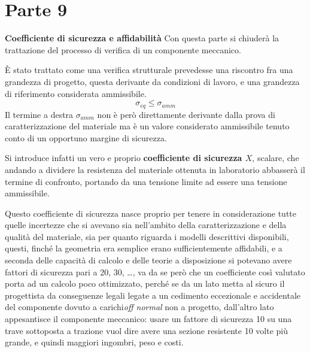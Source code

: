 \documentclass{article}
\def\outcome{\textbf{Learning Outcomes:} Outcomes go here. }
\begin{document}
	\section*{Parte 9} %

\begin{adjustwidth}{2in}{} 
	
\textbf{{\Large Coefficiente di
		sicurezza e affidabilità}} \mbox{} \newline
		Con questa parte si chiuderà la trattazione del processo di verifica di un componente meccanico. \newline
		
		È stato trattato come una verifica strutturale prevedesse una riscontro fra una grandezza di progetto, questa derivante da condizioni di lavoro, e una grandezza di riferimento considerata ammissibile. 		
		\[\sigma_{eq}\leq \sigma_{amm}\]		
		Il termine a destra $\sigma_{amm}$ non è però direttamente derivante dalla prova di caratterizzazione del materiale ma è un valore considerato ammissibile tenuto conto di un opportuno margine di sicurezza. \newline
		
		Si introduce infatti un vero e proprio \textbf{coefficiente di sicurezza $X$}, scalare, che andando a dividere la resistenza del materiale ottenuta in laboratorio abbasserà il termine di confronto, portando da una tensione limite ad essere una tensione ammissibile. \newline
		
		Questo coefficiente di sicurezza nasce proprio per tenere in considerazione tutte quelle incertezze che si avevano sia nell'ambito della caratterizzazione e della qualità del materiale, sia per quanto riguarda i modelli descrittivi disponibili, questi, finché la geometria era semplice erano sufficientemente affidabili, e a seconda delle capacità di calcolo e delle teorie a disposizione si potevano avere fattori di sicurezza pari a 20, 30, \dots, va da se però che un coefficiente così valutato porta ad un calcolo poco ottimizzato, perché se da un lato metta al sicuro il  progettista da conseguenze legali legate a un cedimento eccezionale e accidentale del componente dovuto a carichi\textit{off normal} non a progetto, dall'altro lato appesantisce il componente meccanico: usare un fattore di sicurezza 10 su una trave sottoposta a trazione vuol dire avere una sezione resistente  10 volte più grande, e quindi maggiori ingombri, peso e costi. 
	    

\end{adjustwidth}
\end{document}
